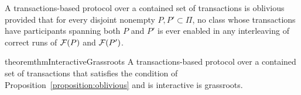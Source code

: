 \begin{proposition}
\label{proposition:oblivious}
A transactions-based protocol over a contained set of transactions is oblivious provided that for every disjoint nonempty $P, P' \subset \Pi$, no class whose transactions have participants spanning both $P$ and $P'$ is ever enabled in any interleaving of correct runs of $\mathcal{F}(P)$ and $\mathcal{F}(P')$.
\end{proposition}

\begin{restatable}{theorem}{thmInteractiveGrassroots}
\label{theorem:interactive-grassroots}
A transactions-based protocol over a contained set of transactions that satisfies the condition of Proposition~\ref{proposition:oblivious} and is interactive is grassroots.
\end{restatable}
